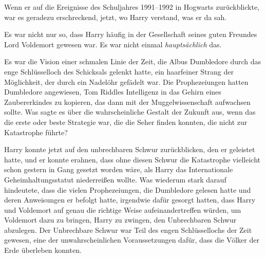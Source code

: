 Wenn er auf die Ereignisse des Schuljahres 1991–1992 in Hogwarts zurückblickte, war es geradezu erschreckend, jetzt, wo Harry verstand, was er da sah.

Es war nicht nur so, dass Harry häufig in der Gesellschaft seines guten Freundes Lord Voldemort gewesen war. Es war nicht einmal \emph{hauptsächlich} das.

Es war die Vision einer schmalen Linie der Zeit, die Albus Dumbledore durch das enge Schlüsselloch des Schicksals gelenkt hatte, ein haarfeiner Strang der Möglichkeit, der durch ein Nadelöhr gefädelt war.
Die Prophezeiungen hatten Dumbledore angewiesen, Tom Riddles Intelligenz in das Gehirn eines Zaubererkindes zu kopieren, das dann mit der Muggelwissenschaft aufwachsen sollte. Was sagte es über die wahrscheinliche Gestalt der Zukunft aus, wenn das die erste oder beste Strategie war, die die Seher finden konnten, die nicht zur Katastrophe führte?

Harry konnte jetzt auf den unbrechbaren Schwur zurückblicken, den er geleistet hatte, und er konnte erahnen, dass ohne diesen Schwur die Katastrophe vielleicht schon gestern in Gang gesetzt worden wäre, als Harry das Internationale Geheimhaltungsstatut niederreißen wollte.
Was wiederum stark darauf hindeutete, dass die vielen Prophezeiungen, die Dumbledore gelesen hatte und deren Anweisungen er befolgt hatte, irgendwie dafür gesorgt hatten, dass Harry und Voldemort auf genau die richtige Weise aufeinandertreffen würden, um Voldemort dazu zu bringen, Harry zu zwingen, den Unbrechbaren Schwur abzulegen. Der Unbrechbare Schwur war Teil des engen Schlüssellochs der Zeit gewesen, eine der unwahrscheinlichen Voraussetzungen dafür, dass die Völker der Erde überleben konnten.


